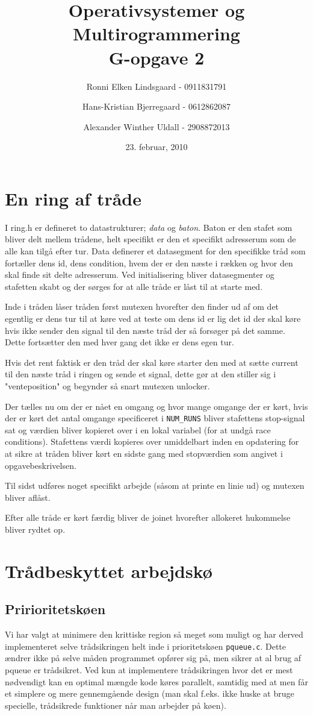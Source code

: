 \documentclass[titlepage]{article}
\title{Operativsystemer og Multirogrammering \\G-opgave 2}
\author{Ronni Elken Lindsgaard - 0911831791 \and
Hans-Kristian Bjerregaard - 0612862087 \and
Alexander Winther Uldall - 2908872013}
\date{23. februar, 2010}
\begin{document}
\maketitle
\newpage
\section{En ring af tråde}
I ring.h er defineret to datastrukturer; {\it data} og {\it baton}. Baton er den stafet som bliver delt mellem trådene, helt specifikt er den et specifikt adresserum som de alle kan tilgå efter tur.
Data definerer et datasegment for den specifikke tråd som fortæller dens id, dens condition, hvem der er den næste i rækken og hvor den skal finde sit delte adresserum.
Ved initialisering bliver datasegmenter og stafetten skabt og der sørges for at alle tråde er låst til at starte med.

Inde i tråden låser tråden først mutexen hvorefter den finder ud af om det egentlig er dens tur til at køre ved at teste om dens id er lig det id der skal køre hvis ikke sender den signal til den næste tråd der så forsøger på det samme. Dette fortsætter den med hver gang det ikke er dens egen tur.

Hvis det rent faktisk er den tråd der skal køre starter den med at sætte current til den næste tråd i ringen og sende et signal, dette gør at den stiller sig i "venteposition" og begynder så snart mutexen unlocker.

Der tælles nu om der er nået en omgang og hvor mange omgange der er kørt, hvis der er kørt det antal omgange specificeret i {\tt NUM\_RUNS} bliver stafettens stop-signal sat og værdien bliver kopieret over i en lokal variabel (for at undgå race conditions). Stafettens værdi kopieres over umiddelbart inden en opdatering for at sikre at tråden bliver kørt en sidste gang med stopværdien som angivet i opgavebeskrivelsen.

Til sidst udføres noget specifikt arbejde (såsom at printe en linie ud) og mutexen bliver aflåst.

Efter alle tråde er kørt færdig bliver de joinet hvorefter allokeret hukommelse bliver rydtet op.

\section{Trådbeskyttet arbejdskø}
  \subsection{Pririoritetskøen}
    Vi har valgt at minimere den krittiske region så meget som muligt og har derved implementeret selve trådsikringen helt inde i prioritetskøen {\tt pqueue.c}.
    Dette ændrer ikke på selve måden programmet opfører sig på, men sikrer at al brug af pqueue er trådsikret.
    Ved kun at implementere trådsikringen hvor det er mest nødvendigt kan en optimal mængde kode køres parallelt, samtidig med at men får et simplere og mere gennemgående design (man skal f.eks. ikke huske at bruge specielle, trådsikrede funktioner når man arbejder på køen).
\end{document}
